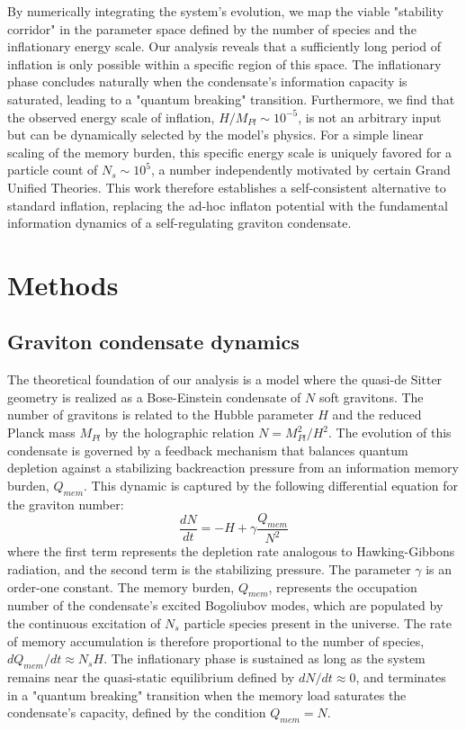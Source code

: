 \documentclass[]{article}
\begin{document}
By numerically integrating the system's evolution, we map the viable "stability corridor" in the parameter space defined by the number of species and the inflationary energy scale. Our analysis reveals that a sufficiently long period of inflation is only possible within a specific region of this space. The inflationary phase concludes naturally when the condensate's information capacity is saturated, leading to a "quantum breaking" transition. Furthermore, we find that the observed energy scale of inflation, $H/M_{Pl} \sim 10^{-5}$, is not an arbitrary input but can be dynamically selected by the model's physics. For a simple linear scaling of the memory burden, this specific energy scale is uniquely favored for a particle count of $N_s \sim 10^5$, a number independently motivated by certain Grand Unified Theories. This work therefore establishes a self-consistent alternative to standard inflation, replacing the ad-hoc inflaton potential with the fundamental information dynamics of a self-regulating graviton condensate.

\section{Methods}
\label{sec:methods}
\subsection{Graviton condensate dynamics}
The theoretical foundation of our analysis is a model where the quasi-de Sitter geometry is realized as a Bose-Einstein condensate of $N$ soft gravitons. The number of gravitons is related to the Hubble parameter $H$ and the reduced Planck mass $M_{Pl}$ by the holographic relation $N = M_{Pl}^2/H^2$. The evolution of this condensate is governed by a feedback mechanism that balances quantum depletion against a stabilizing backreaction pressure from an information memory burden, $Q_{mem}$. This dynamic is captured by the following differential equation for the graviton number:
\begin{equation}
\frac{dN}{dt} = -H + \gamma \frac{Q_{mem}}{N^2}
\label{eq:dNdt}
\end{equation}
where the first term represents the depletion rate analogous to Hawking-Gibbons radiation, and the second term is the stabilizing pressure. The parameter $\gamma$ is an order-one constant. The memory burden, $Q_{mem}$, represents the occupation number of the condensate's excited Bogoliubov modes, which are populated by the continuous excitation of $N_s$ particle species present in the universe. The rate of memory accumulation is therefore proportional to the number of species, $dQ_{mem}/dt \approx N_s H$. The inflationary phase is sustained as long as the system remains near the quasi-static equilibrium defined by $dN/dt \approx 0$, and terminates in a "quantum breaking" transition when the memory load saturates the condensate's capacity, defined by the condition $Q_{mem} = N$.
\end{document}
